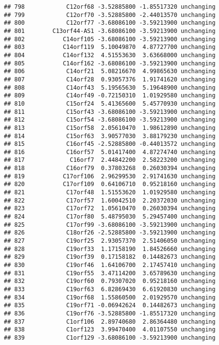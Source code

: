 \documentclass[]{article}
\begin{document}
\begin{verbatim}
## 798            C12orf68 -3.52885800 -1.85517320 unchanging
## 799            C12orf70 -3.52885800 -2.44013570 unchanging
## 800            C12orf77 -3.68086100 -3.59213900 unchanging
## 801        C13orf44-AS1 -3.68086100 -3.59213900 unchanging
## 802           C14orf105 -3.68086100 -3.59213900 unchanging
## 803           C14orf119  5.10049870  4.87727700 unchanging
## 804           C14orf132  4.51553630  3.63668000 unchanging
## 805           C14orf162 -3.68086100 -3.59213900 unchanging
## 806            C14orf21  5.08216670  4.99865630 unchanging
## 807            C14orf28  0.93057376  1.91741620 unchanging
## 808            C14orf43  5.19565630  5.19648900 unchanging
## 809            C14orf49 -0.72150310  1.01929580 unchanging
## 810            C15orf24  5.41365600  5.45770930 unchanging
## 811            C15orf43 -3.68086100 -3.59213900 unchanging
## 812            C15orf54 -3.68086100 -3.59213900 unchanging
## 813            C15orf58  2.05610470  1.98612890 unchanging
## 814            C15orf63  3.90577030  3.88179230 unchanging
## 815            C16orf45 -2.52885800 -0.44013572 unchanging
## 816            C16orf57  5.01417400  4.87274740 unchanging
## 817             C16orf7  2.44842200  2.58223200 unchanging
## 818            C16orf79  0.37803268  0.26030394 unchanging
## 819           C17orf106  2.96299530  2.91741630 unchanging
## 820           C17orf109  0.64106710  0.95218160 unchanging
## 821            C17orf48  1.51553620  1.01929580 unchanging
## 822            C17orf57  1.60042510  2.20372030 unchanging
## 823            C17orf72  1.05610470  0.26030394 unchanging
## 824            C17orf80  5.48795030  5.29457400 unchanging
## 825            C17orf99 -3.68086100 -3.59213900 unchanging
## 826            C18orf26 -2.52885800 -3.59213900 unchanging
## 827            C19orf25  2.93057370  2.51406050 unchanging
## 828            C19orf33  1.17158190  1.84526660 unchanging
## 829            C19orf39  0.17158182  0.14482673 unchanging
## 830            C19orf46  1.64106700  2.17457410 unchanging
## 831            C19orf55  3.47114200  3.65789630 unchanging
## 832            C19orf60  0.79307020  0.95218160 unchanging
## 833            C19orf63  6.82869430  6.61920830 unchanging
## 834            C19orf68  1.55860500  2.01929570 unchanging
## 835            C19orf71 -0.06942624  0.14482673 unchanging
## 836            C19orf76 -3.52885800 -1.85517320 unchanging
## 837            C1orf106  2.89740680  2.86364480 unchanging
## 838            C1orf123  3.99470400  4.01107550 unchanging
## 839            C1orf129 -3.68086100 -3.59213900 unchanging

\end{verbatim}
\end{document}
